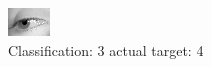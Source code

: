 \begin{figure}[h!]
\begin{center}
\includegraphics[width=0.60\columnwidth]{figures/ID2964_class_3_target_4.png}
\end{center}
\caption{ Classification: 3 actual target: 4}
\label{fig:ID2964_class_3_target_4}
\end{figure}
